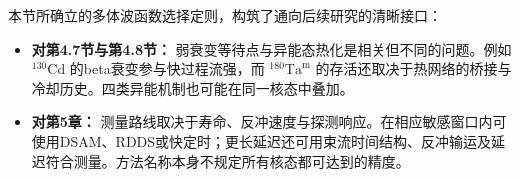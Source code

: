 本节所确立的多体波函数选择定则，构筑了通向后续研究的清晰接口：
\begin{itemize}
\item \textbf{对第4.7节与第4.8节：} 弱衰变等待点与异能态热化是相关但不同的问题。例如 $^{130}\mathrm{Cd}$ 的beta衰变参与快过程流强，而 $^{180}\mathrm{Ta}^{\mathrm m}$ 的存活还取决于热网络的桥接与冷却历史。四类异能机制也可能在同一核态中叠加。
\item \textbf{对第5章：} 测量路线取决于寿命、反冲速度与探测响应。在相应敏感窗口内可使用DSAM、RDDS或快定时；更长延迟还可用束流时间结构、反冲输运及延迟符合测量。方法名称本身不规定所有核态都可达到的精度。
\end{itemize}
